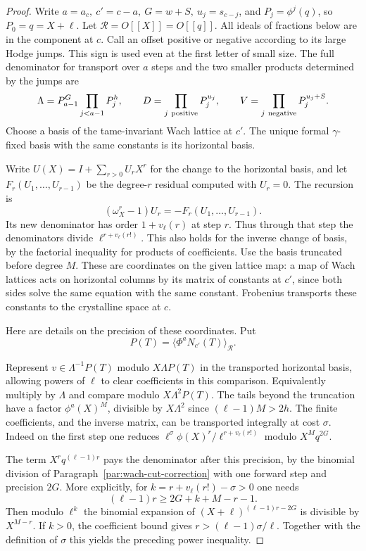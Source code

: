 \begin{proof}
Write \(a=a_c,\ c'=c-a,\ G=w+S,\ u_j=s_{c-j}\), and
\(P_j=\phi^j(q)\), so \(P_0=q=X+\ell\).
Let \(\mathcal R=O[[X]]=O[[q]]\). All ideals of fractions below
are in the component at \(c\).
Call an offset positive or negative according to its large Hodge
jumps. This sign is used even at the first letter of small size.
The full denominator for transport over \(a\) steps and the two
smaller products determined by the jumps are
\[
 \Lambda=P_{a-1}^{G}\prod_{j<a-1}P_j^h,\qquad
 D=\prod_{j\ {\rm positive}}P_j^{u_j},\qquad
 V=\prod_{j\ {\rm negative}}P_j^{u_j+S}.
\]
Choose a basis of the tame-invariant Wach lattice at \(c'\).
The unique formal \(\gamma\)-fixed basis with the same constants is
its horizontal basis.

Write \(U(X)=I+\sum_{r>0}U_rX^r\) for the change
to the horizontal basis, and let \(F_r(U_1,\ldots,U_{r-1})\)
be the degree-\(r\) residual computed with \(U_r=0\).
The recursion is
\[
       (\omega_X^r-1)U_r=-F_r(U_1,\ldots,U_{r-1}).
\]
Its new denominator has order \(1+v_\ell(r)\) at step \(r\).
Thus through that step the denominators divide
\(\ell^{r+v_\ell(r!)}\). This also holds for the inverse change
of basis, by the factorial inequality for products of coefficients.
Use the basis truncated before degree \(M\). These are coordinates
on the given lattice map: a map of Wach lattices acts on horizontal
columns by its matrix of constants at \(c'\), since both sides solve
the same equation with the same constant. Frobenius transports these
constants to the crystalline space at \(c\).

Here are details on the precision of these coordinates. Put
\[
 P(T)=\langle\Phi^aN_{c'}(T)\rangle_{\mathcal R}.
\]

Represent \(v\in\Lambda^{-1}P(T)\) modulo \(X\Lambda P(T)\)
in the transported horizontal basis, allowing powers of \(\ell\)
to clear coefficients in this comparison. Equivalently multiply
by \(\Lambda\) and compare modulo \(X\Lambda^2 P(T)\).
The tails beyond the truncation have a factor
\(\phi^a(X)^M\), divisible by \(X\Lambda^2\) since
\((\ell-1)M>2h\). The finite coefficients, and the inverse matrix,
can be transported integrally at cost \(\sigma\). Indeed on
the first step one reduces \(\ell^\sigma\phi(X)^r/\ell^{r+v_\ell(r!)}\)
modulo \(X^Mq^{2G}\).

The term \(X^r q^{(\ell-1)r}\) pays the
denominator after this precision, by the binomial division of
Paragraph~\ref{par:wach-cut-correction} with one forward step and
precision \(2G\). More explicitly, for \(k=r+v_\ell(r!)-\sigma>0\)
one needs
\[
 (\ell-1)r\ge 2G+k+M-r-1.
\]
Then modulo \(\ell^k\)
the binomial expansion of \((X+\ell)^{(\ell-1)r-2G}\) is divisible
by \(X^{M-r}\). If \(k>0\), the coefficient bound gives
\(r>(\ell-1)\sigma/\ell\). Together with the definition of
\(\sigma\) this yields the preceding power inequality.


\end{proof}
